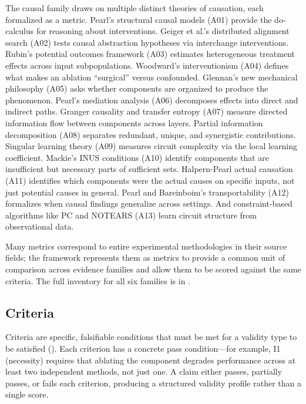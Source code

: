\documentclass[10pt]{article}
\begin{document}
The causal family draws on multiple distinct theories of causation, each formalized as a metric. Pearl's structural causal models (A01) provide the do-calculus for reasoning about interventions. Geiger et al.'s distributed alignment search (A02) tests causal abstraction hypotheses via interchange interventions. Rubin's potential outcomes framework (A03) estimates heterogeneous treatment effects across input subpopulations. Woodward's interventionism (A04) defines what makes an ablation ``surgical'' versus confounded. Glennan's new mechanical philosophy (A05) asks whether components are organized to produce the phenomenon. Pearl's mediation analysis (A06) decomposes effects into direct and indirect paths. Granger causality and transfer entropy (A07) measure directed information flow between components across layers. Partial information decomposition (A08) separates redundant, unique, and synergistic contributions. Singular learning theory (A09) measures circuit complexity via the local learning coefficient. Mackie's INUS conditions (A10) identify components that are insufficient but necessary parts of sufficient sets. Halpern-Pearl actual causation (A11) identifies which components were the actual causes on specific inputs, not just potential causes in general. Pearl and Bareinboim's transportability (A12) formalizes when causal findings generalize across settings. And constraint-based algorithms like PC and NOTEARS (A13) learn circuit structure from observational data.


Many metrics correspond to entire experimental methodologies in their source fields; the framework represents them as metrics to provide a common unit of comparison across evidence families and allow them to be scored against the same criteria. The full inventory for all six families is in .


\subsection{Criteria}
\label{sec:criteria}

Criteria are specific, falsifiable conditions that must be met for a validity type to be satisfied (). Each criterion has a concrete pass condition---for example, I1 (necessity) requires that ablating the component degrades performance across at least two independent methods, not just one. A claim either passes, partially passes, or fails each criterion, producing a structured validity profile rather than a single score.
\end{document}
